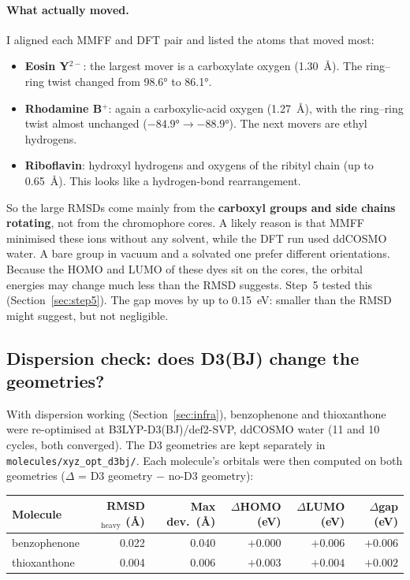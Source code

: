 \documentclass[11pt,a4paper]{article}
\begin{document}
\paragraph{What actually moved.} I aligned each MMFF and DFT pair and listed the atoms that moved
most:
\begin{itemize}
  \item \textbf{Eosin Y$^{2-}$}: the largest mover is a carboxylate oxygen (1.30~\AA). The
  ring--ring twist changed from \ang{98.6} to \ang{86.1}.
  \item \textbf{Rhodamine B$^+$}: again a carboxylic-acid oxygen (1.27~\AA), with the ring--ring
  twist almost unchanged ($-\ang{84.9}\to-\ang{88.9}$). The next movers are ethyl hydrogens.
  \item \textbf{Riboflavin}: hydroxyl hydrogens and oxygens of the ribityl chain (up to
  0.65~\AA). This looks like a hydrogen-bond rearrangement.
\end{itemize}
So the large RMSDs come mainly from the \textbf{carboxyl groups and side chains rotating}, not
from the chromophore cores. A likely reason is that MMFF minimised these ions without any solvent,
while the DFT run used ddCOSMO water. A bare  group in vacuum and a solvated one prefer
different orientations. Because the HOMO and LUMO of these dyes sit on the cores, the orbital
energies may change much less than the RMSD suggests. Step~5 tested this (Section~\ref{sec:step5}).
The gap moves by up to 0.15~eV: smaller than the RMSD might suggest, but not negligible.

\subsection{Dispersion check: does D3(BJ) change the geometries?}\label{sec:d3}
With dispersion working (Section~\ref{sec:infra}), benzophenone and thioxanthone were re-optimised at
B3LYP-D3(BJ)/def2-SVP, ddCOSMO water (11 and
10 cycles, both converged). The D3 geometries are kept
separately in \texttt{molecules/xyz\_opt\_d3bj/}. Each molecule's orbitals were then computed on both
geometries ($\Delta$ = D3 geometry $-$ no-D3 geometry):

\begin{center}\small
\begin{tabular}{@{}lrrrrr@{}}
\toprule
Molecule & RMSD$_\text{heavy}$ (\AA) & Max dev.\ (\AA) & $\Delta$HOMO (eV) & $\Delta$LUMO (eV) & $\Delta$gap (eV) \\
\midrule
benzophenone & 0.022 & 0.040 & ${+}0.000$ & ${+}0.006$ & ${+}0.006$ \\
thioxanthone & 0.004 & 0.006 & ${+}0.003$ & ${+}0.004$ & ${+}0.002$ \\
\bottomrule
\end{tabular}
\end{center}
\end{document}
